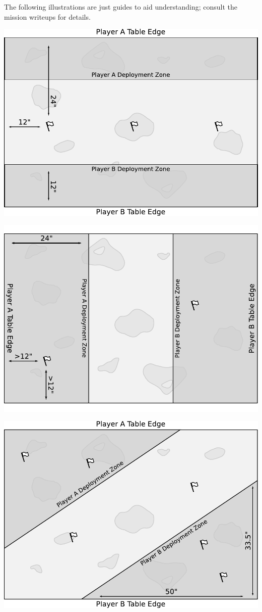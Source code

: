 \documentclass{40k}
\begin{document}
The following illustrations are just guides to aid understanding;
consult the mission writeups for details.


\bigskip\centerline{\includegraphics[scale=0.6]{maps/mission1}}


\bigskip\centerline{\includegraphics[scale=0.6]{maps/mission2}}


\bigskip\centerline{\includegraphics[scale=0.6]{maps/mission3}}




\end{document}
